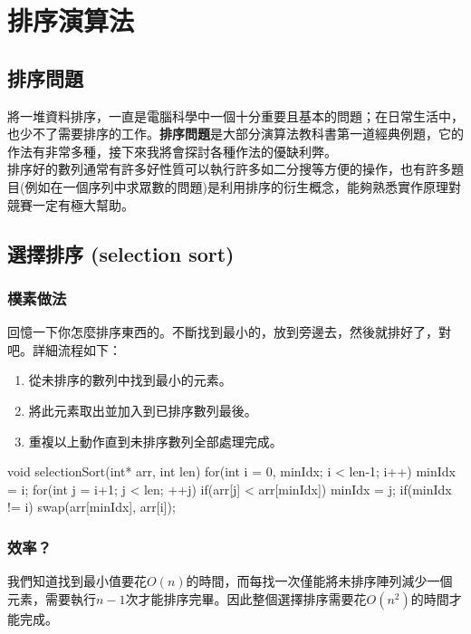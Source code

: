 \chapter{排序演算法}
\section{排序問題}
將一堆資料排序，一直是電腦科學中一個十分重要且基本的問題；在日常生活中，也少不了需要排序的工作。\textbf{排序問題}是大部分演算法教科書第一道經典例題，它的作法有非常多種，接下來我將會探討各種作法的優缺利弊。\\
排序好的數列通常有許多好性質可以執行許多如二分搜等方便的操作，也有許多題目(例如在一個序列中求眾數的問題)是利用排序的衍生概念，能夠熟悉實作原理對競賽一定有極大幫助。

\section{選擇排序 (selection sort)}
\subsection{樸素做法}
回憶一下你怎麼排序東西的。不斷找到最小的，放到旁邊去，然後就排好了，對吧。詳細流程如下：
\begin{enumerate}
\item 從未排序的數列中找到最小的元素。
\item 將此元素取出並加入到已排序數列最後。
\item 重複以上動作直到未排序數列全部處理完成。
\end{enumerate}
\begin{C++}
void selectionSort(int* arr, int len){
    for(int i = 0, minIdx; i < len-1; i++){
        minIdx = i;
        for(int j = i+1; j < len; ++j)
            if(arr[j] < arr[minIdx])
                minIdx = j;
        if(minIdx != i)
            swap(arr[minIdx], arr[i]);
    }
}
\end{C++}
\subsection{效率？}
我們知道找到最小值要花$O(n)$的時間，而每找一次僅能將未排序陣列減少一個元素，需要執行$n-1$次才能排序完畢。因此整個選擇排序需要花$O(n^2)$的時間才能完成。


